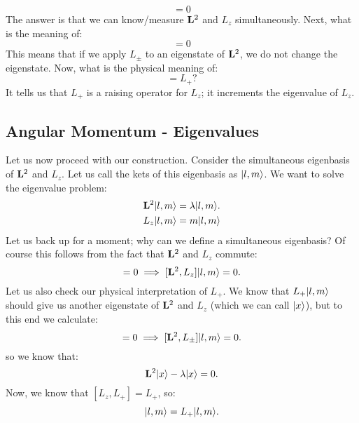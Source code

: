 \begin{equation}
    [\v{L}^2, L_z] = 0
\end{equation}
The answer is that we can know/measure $\mathbf{L}^2$ and $L_z$ simultaneously. Next, what is the meaning of:
\begin{equation}
    [\v{L}^2, L_\pm] = 0
\end{equation}
This means that if we apply $L_{\pm}$ to an eigenstate of $\mathbf{L}^2$, we do not change the eigenstate. Now, what is the physical meaning of:
\begin{equation}
    [L_z, L_+] = L_+?
\end{equation} 
It tells us that $L_+$ is a raising operator for $L_z$; it increments the eigenvalue of $L_z$. 

\subsection{Angular Momentum - Eigenvalues}
Let us now proceed with our construction. Consider the simultaneous eigenbasis of $\mathbf{L}^2$ and $L_z$. Let us call the kets of this eigenbasis as $\lvert l, m \rangle$. We want to solve the eigenvalue problem:
\begin{equation}
    \begin{split}
        \mathbf{L}^2\lvert l, m \rangle &= \lambda\lvert l, m \rangle.
        \\ L_z\lvert l, m \rangle &= m\lvert l, m \rangle
    \end{split}  
\end{equation}
Let us back up for a moment; why can we define a simultaneous eigenbasis? Of course this follows from the fact that $\mathbf{L}^2$ and $L_z$ commute:
\begin{equation}
    [\v{L}^2, L_z] = 0 \implies [\v{L}^2, L_z]\ket{l, m} = 0.
\end{equation}
Let us also check our physical interpretation of $L_+$. We know that $L_+\lvert l, m \rangle$ should give us another eigenstate of $\mathbf{L}^2$ and $L_z$ (which we can call $\lvert x \rangle$), but to this end we calculate:
\begin{equation}
    [\v{L}^2, L_\pm] = 0 \implies [\v{L}^2, L_\pm]\ket{l, m} = 0.
\end{equation}
so we know that:
\begin{equation}
    \mathbf{L}^2\lvert x \rangle - \lambda\lvert x \rangle = 0.
\end{equation}
Now, we know that $[L_z, L_+] = L_+$, so:
\begin{equation}
    [L_z, L_+]\ket{l, m} = L_+\ket{l, m}.
\end{equation}
